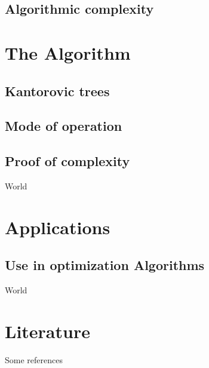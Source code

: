 \documentclass[compress]{beamer}
\begin{document}
\begin{frame}[t]

\end{frame}


\subsection{Algorithmic complexity}

\section{The Algorithm}
\subsection{Kantorovic trees}
\subsection{Mode of operation}
\subsection{Proof of complexity}

\begin{frame}
	World
\end{frame}

\section{Applications}
\subsection{Use in optimization Algorithms}

\begin{frame}
	World
\end{frame}

\section{Literature}
\begin{frame}
	Some references
\end{frame}
\end{document}
